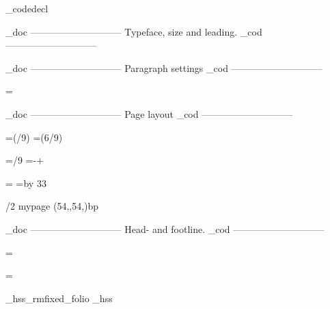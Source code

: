 \_codedecl 

    \_doc -----------------------------
    Typeface, size and leading.
    \_cod -----------------------------

\fontfam[ebgaramond]
\typosize[11/14]

\def\ChapRed{\setcmykcolor{0 1 1 0.10}}

    \_doc -----------------------------
    Paragraph settings
    \_cod -----------------------------

\parskip=0pt
\parindent=\baselineskip

\relax
{}\relax


    \_doc -----------------------------
    Page layout
    \_cod -----------------------------



\newdimen\pagewidth     \pagewidth=6in
\newdimen\spinemargin   \spinemargin=\dimexpr(\pagewidth/9)\relax
\newdimen\measure       \measure=\dimexpr(6\pagewidth/9)

\newdimen\pageheight    \pageheight=9in 
\newdimen\depth         \depth=6in     
\newdimen\topmargin     \topmargin=/9\relax
\headlinedist=\dimexpr\baselineskip-\topskip+\baselineskip\relax
{}\baselineskip

%

\hsize=\measure
\vsize=\topskip \advance\vsize by 33\baselineskip %

\margins/2 mypage (54,,54,)bp

    \_doc -----------------------------
    Head- and footline.
    \_cod -----------------------------

\newif\ifheadline \headlinetrue
\newif\iffootline \footlinetrue

\def\_runningchap{}

\headline={%
    \ifheadline
        \ifodd\pageno
            \hss{\it\_runningchap}\hss
        \else
            \hss{\it The Man who was Thursday}\hss
        \fi
    \else
        \global\headlinetrue
    \fi    
}

\footline={%
    \iffootline
        \ifodd\pageno
            \_hss\_rmfixed\currvar \_folio \_hss%
        \else
            \_hss\_rmfixed\setff{+onum,+pnum}\currvar \_folio \_hss%
        \fi
    \else
        \global\footlinetrue
    \fi
}

